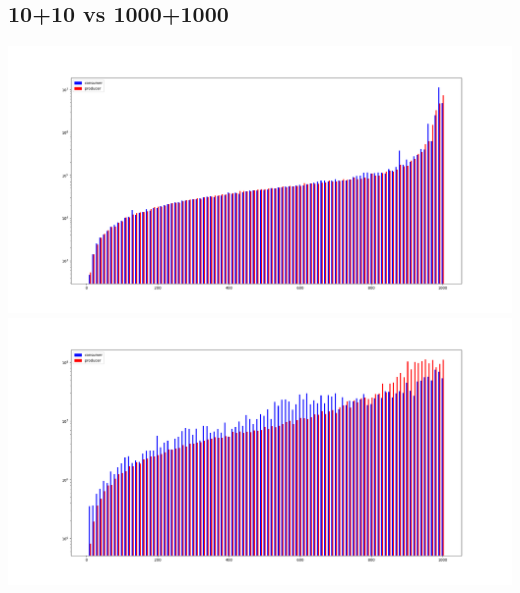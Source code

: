 \documentclass[11pt, a4paper]{article}
\begin{document}
\begin{center}
\section{10+10 vs 1000+1000}
\includegraphics[scale=0.3]{10_10_1000_rand_norm}
\includegraphics[scale=0.3]{1000_1000_1000_rand_norm}



\end{center}
\end{document}
